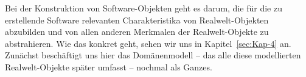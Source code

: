 Bei der Konstruktion von Software-Objekten geht es darum, die für die zu erstellende Software relevanten Charakteristika von Realwelt-Objekten abzubilden und von allen anderen Merkmalen der Realwelt-Objekte zu abstrahieren. Wie das konkret geht, sehen wir uns in Kapitel~\ref{sec:Kap-4} an. Zunächst beschäftigt uns hier das Domänenmodell -- das alle diese modellierten Realwelt-Objekte später umfasst -- nochmal als Ganzes.